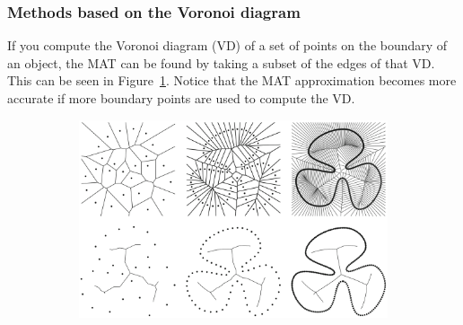 \subsubsection{Methods based on the Voronoi diagram}
If you compute the Voronoi diagram (VD) of a set of points on the boundary of an object, the MAT can be found by taking a subset of the edges of that VD.
This can be seen in Figure~\ref{fig:vdmat}. 
Notice that the MAT approximation becomes more accurate if more boundary points are used to compute the VD.
\begin{figure}[tbp]
	\centering
	\begin{subfigure}{0.55\linewidth}
		\centering
		\includegraphics[width=\textwidth,angle=270]{figs/vdmat.png}
		\label{fig:vdmat}
	\end{subfigure}
	\qquad
	\begin{subfigure}{0.39\linewidth}
		\centering

\end{subfigure}
\end{figure}
